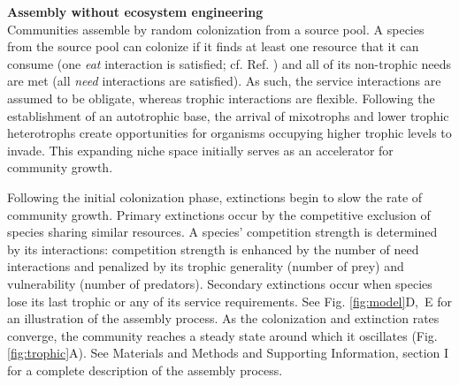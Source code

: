 \documentclass[twocolumn,preprintnumbers,amsmath,amssymb,superscriptaddress]{revtex4}
\begin{document}
\vspace{-3mm}
\noindent \textbf{Assembly without ecosystem engineering}\\
\noindent Communities assemble by random colonization from a source pool.
A species from the source pool can colonize if it finds at least one resource that it can consume (one \emph{eat} interaction is satisfied; cf. Ref. ) and all of its non-trophic needs are met (all \emph{need} interactions are satisfied). 
As such, the service interactions are assumed to be obligate, whereas trophic interactions are flexible.
Following the establishment of an autotrophic base, the arrival of mixotrophs and lower trophic heterotrophs create opportunities for organisms occupying higher trophic levels to invade.
This expanding niche space initially serves as an accelerator for community growth.

Following the initial colonization phase, extinctions begin to slow the rate of community growth.
Primary extinctions occur by the competitive exclusion of species sharing similar resources.
A species' competition strength is determined by its interactions: competition strength is enhanced by the number of need interactions and penalized by its trophic generality (number of prey) and vulnerability (number of predators).
Secondary extinctions occur when species lose its last trophic or any of its service requirements.
See Fig. \ref{fig:model}D,~E for an illustration of the assembly process. 
As the colonization and extinction rates converge, the community reaches a steady state around which it oscillates (Fig. \ref{fig:trophic}A).
See Materials and Methods and Supporting Information, section I for a complete description of the assembly process. %
\end{document}
